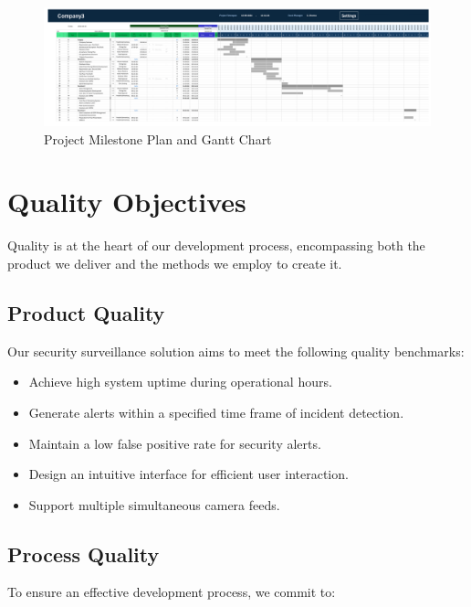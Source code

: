 \begin{figure}[h]
    \centering
    \includegraphics[width=\textwidth]{Milestone Plan-1.png}
    \caption{Project Milestone Plan and Gantt Chart}
    \label{fig:milestone-plan}
\end{figure}

\section{Quality Objectives}

Quality is at the heart of our development process, encompassing both the product we deliver and the methods we employ to create it.

\subsection{Product Quality}

Our security surveillance solution aims to meet the following quality benchmarks:

\begin{itemize}
    \item Achieve high system uptime during operational hours.
    \item Generate alerts within a specified time frame of incident detection.
    \item Maintain a low false positive rate for security alerts.
    \item Design an intuitive interface for efficient user interaction.
    \item Support multiple simultaneous camera feeds.
\end{itemize}


\subsection{Process Quality}

To ensure an effective development process, we commit to:

